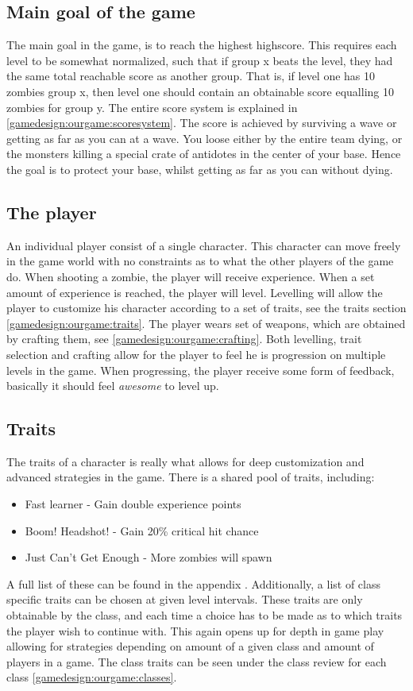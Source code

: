 \subsection*{Main goal of the game}
The main goal in the game, is to reach the highest highscore. This requires each level to be somewhat normalized, such that if group x beats the level, they had the same total reachable score as another group. That is, if level one has 10 zombies group x, then level one should contain an obtainable score equalling 10 zombies for group y. The entire score system is explained in \ref{gamedesign:ourgame:scoresystem}. The score is achieved by surviving a wave or getting as far as you can at a wave. You loose either by the entire team dying, or the monsters killing a special crate of antidotes in the center of your base. Hence the goal is to protect your base, whilst getting as far as you can without dying.

\subsection*{The player}
 An individual player consist of a single character. This character can move freely in the game world with no constraints as to what the other players of the game do. When shooting a zombie, the player will receive experience. When a set amount of experience is reached, the player will level. Levelling will allow the player to customize his character according to a set of traits, see the traits section \ref{gamedesign:ourgame:traits}. The player wears set of weapons, which are obtained by crafting them, see \ref{gamedesign:ourgame:crafting}. Both levelling, trait selection and crafting allow for the player to feel he is progression on multiple levels in the game. When progressing, the player receive some form of feedback, basically it should feel \emph{awesome} to level up.

\subsection*{Traits}\label{gamedesign:ourgame:traits}
The traits of a character is really what allows for deep customization and advanced strategies in the game. There is a shared pool of traits, including:
\begin{itemize}
\item Fast learner - Gain double experience points
\item Boom! Headshot!  - Gain 20\% critical hit chance
\item Just Can’t Get Enough - More zombies will spawn
\end{itemize} 
A full list of these can be found in the appendix . Additionally, a list of class specific traits can be chosen at given level intervals. These traits are only obtainable by the class, and each time a choice has to be made as to which traits the player wish to continue with. This again opens up for depth in game play allowing for strategies depending on amount of a given class and amount of players in a game. The class traits can be seen under the class review for each class \ref{gamedesign:ourgame:classes}.

